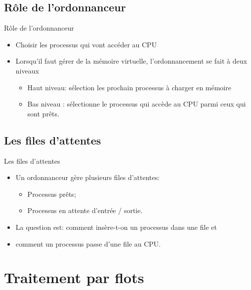 \begin{frame}{\sectitle}
\def\subsectitle{Rôle de l'ordonnanceur}
\subsection{\subsectitle}

\begin{block}{\subsectitle}
\begin{itemize}
    \item Choisir les processus qui vont accéder au CPU
    \item Lorsqu'il faut gérer de la mémoire virtuelle, l'ordonnancement se
    fait à deux niveaux
    \begin{itemize}
        \item Haut niveau: sélection les prochain processus à charger en mémoire
        \item Bas niveau : sélectionne le processus qui accède au CPU parmi ceux
        qui sont prêts.
    \end{itemize}
\end{itemize}
\end{block}

\def\subsectitle{Les files d'attentes}
\subsection{\subsectitle}

\begin{block}{\subsectitle}
\begin{itemize}
    \item Un ordonnanceur gère plusieurs files d'attentes: 
    \begin{itemize}
        \item Processus prêts;
        \item Processus en attente d'entrée / sortie.
    \end{itemize}
    \item La question est: comment insère-t-on un processus dans une file et
    \item comment un processus passe d'une file au CPU.
\end{itemize}
\end{block}
\end{frame}

\def\sectitle{Traitement par flots}
\section{\sectitle}

